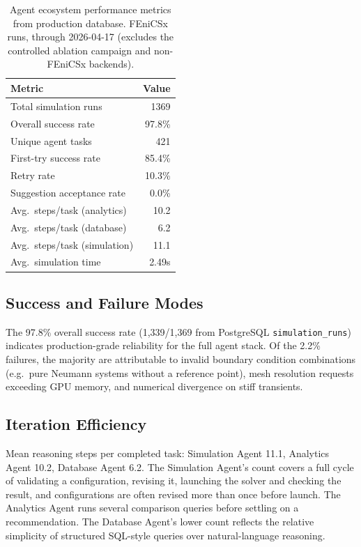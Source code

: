 \documentclass[preprint,review,12pt]{elsarticle}
\newif\ifrevisionsvisible
\newcommand{\revised}[1]{%
  \ifrevisionsvisible\textcolor{revisionred}{#1}\else#1\fi}
\begin{document}
\begin{table}[htbp]
\centering
\caption{Agent ecosystem performance metrics from production database.
\revised{FEniCSx runs, through 2026-04-17 (excludes the controlled ablation
campaign and non-FEniCSx backends).}}
\label{tab:agent-metrics}
\begin{tabular}{lr}
\toprule
Metric & Value \\
\midrule
Total simulation runs & 1369 \\
Overall success rate & 97.8\% \\
Unique agent tasks & \revised{421} \\
First-try success rate & \revised{85.4\%} \\
\revised{Retry rate} & \revised{10.3\%} \\
Suggestion acceptance rate & 0.0\% \\
Avg.\ steps/task (analytics) & 10.2 \\
Avg.\ steps/task (database) & 6.2 \\
Avg.\ steps/task (simulation) & \revised{11.1} \\
Avg.\ simulation time & \revised{2.49s} \\
\bottomrule
\end{tabular}
\end{table}

\subsection{Success and Failure Modes}

The 97.8\% overall success rate (1{,}339/1{,}369 from PostgreSQL
\texttt{simulation\_runs}) indicates production-grade reliability
for the full agent stack.  Of the 2.2\% failures, the majority are attributable to invalid boundary condition
combinations (e.g.\ pure Neumann systems without a reference point), mesh
resolution requests exceeding GPU memory, and numerical divergence on
stiff transients.

\subsection{Iteration Efficiency}

\revised{Mean reasoning steps per completed task: Simulation Agent 11.1,
Analytics Agent 10.2, Database Agent 6.2.  The Simulation Agent's count
covers a full cycle of validating a configuration, revising it, launching
the solver and checking the result, and configurations are often revised
more than once before launch.  The Analytics Agent runs several
comparison queries before settling on a recommendation.}  The Database
Agent's lower count reflects the relative simplicity of structured
SQL-style queries over natural-language reasoning.
\end{document}
